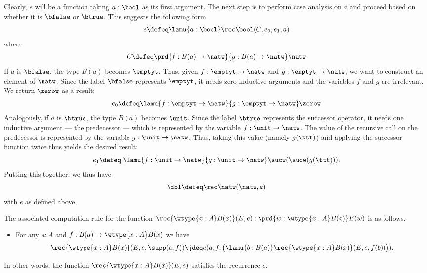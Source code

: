 Clearly, $e$ will be a function taking $a : \bool$ as its first argument. The next step is to perform case analysis on $a$ and proceed based on whether it is $\bfalse$ or $\btrue$. This suggests the following form
\[ e \defeq \lamu{a:\bool} \rec\bool(C,e_0,e_1,a) \]
where \[C \defeq \prd{f : B(a) \to \natw}{g : B(a) \to \natw} \natw\]
If $a$ is $\bfalse$, the type $B(a)$ becomes $\emptyt$. Thus, given $f : \emptyt \to \natw$ and $g : \emptyt \to \natw$, we want to construct an element of $\natw$. Since the label $\bfalse$ represents $\emptyt$, it needs zero inductive arguments and the variables $f$ and $g$ are irrelevant. We return $\zerow$ as a result:
\[ e_0 \defeq \lamu{f:\emptyt \to \natw}{g:\emptyt \to \natw} \zerow \]
Analogously, if $a$ is $\btrue$, the type $B(a)$ becomes $\unit$.
Since the label $\btrue$ represents the successor operator, it needs one inductive argument --- the predecessor --- which is represented by the variable $f : \unit \to \natw$.
The value of the recursive call on the predecessor is represented by the variable $g : \unit \to \natw$.
Thus, taking this value (namely $g(\ttt)$) and applying the successor function twice thus yields the desired result:
\begin{equation*}
e_1 \defeq \; \lamu{f:\unit \to \natw}{g:\unit \to \natw} \sucw(\sucw(g(\ttt))).
\end{equation*}
Putting this together, we thus have
\[ \dbl \defeq \rec\natw(\natw, e) \]
with $e$ as defined above.

The associated computation rule for the function $\rec{\wtype{x:A} B(x)}(E,e) : \prd{w : \wtype{x:A} B(x)} E(w)$ is as follows.
%
\begin{itemize}
\item
  For any $a : A$ and $f : B(a) \to \wtype{x:A} B(x)$ we have
  \begin{equation*}
    \rec{\wtype{x:A} B(x)}(E,e,\supp(a,f)) \jdeq
    e(a,f,\big(\lamu{b:B(a)} \rec{\wtype{x:A} B(x)}(E,e,f(b))\big)).
  \end{equation*}
\end{itemize}
In other words, the function $\rec{\wtype{x:A} B(x)}(E,e)$ satisfies the recurrence $e$.


